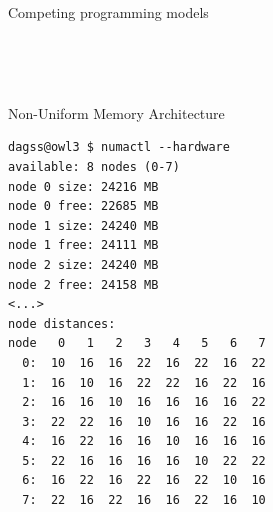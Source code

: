 \documentclass[sans,mathserif]{beamer}
\begin{document}
\begin{frame}{Competing programming models}

~



~

\end{frame}

\begin{frame}[fragile]{Non-Uniform Memory Architecture}
\footnotesize
\begin{verbatim}
dagss@owl3 $ numactl --hardware
available: 8 nodes (0-7)
node 0 size: 24216 MB
node 0 free: 22685 MB
node 1 size: 24240 MB
node 1 free: 24111 MB
node 2 size: 24240 MB
node 2 free: 24158 MB
<...>
node distances:
node   0   1   2   3   4   5   6   7 
  0:  10  16  16  22  16  22  16  22 
  1:  16  10  16  22  22  16  22  16 
  2:  16  16  10  16  16  16  16  22 
  3:  22  22  16  10  16  16  22  16 
  4:  16  22  16  16  10  16  16  16 
  5:  22  16  16  16  16  10  22  22 
  6:  16  22  16  22  16  22  10  16 
  7:  22  16  22  16  16  22  16  10 
\end{verbatim}
\end{frame}
\end{document}
